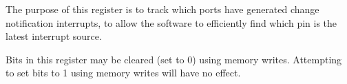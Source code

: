 The purpose of this register is to track which ports have generated change notification interrupts, to allow the software to efficiently find which pin is the latest interrupt source.

Bits in this register may be cleared (set to 0) using memory writes. Attempting to set bits to 1 using memory writes will have no effect.
